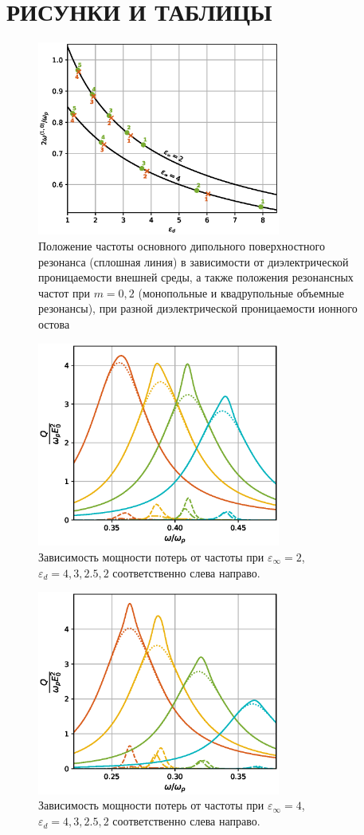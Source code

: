 \documentclass[12pt, a4paper]{article}
\def \eps {\varepsilon}
\begin{document}
\section{РИСУНКИ И ТАБЛИЦЫ}
\begin{figure}[h]
	\centering
	\includegraphics[width=80mm]{./image/fig_w.eps}
	\caption{Положение частоты основного дипольного поверхностного резонанса (сплошная линия) в зависимости от диэлектрической проницаемости внешней среды, а также положения резонансных частот при $m=0,2$ (монопольные и квадрупольные объемные резонансы), при разной диэлектрической проницаемости ионного остова}
	\label{fig_w}
\end{figure} 
\begin{figure}[h]
	\centering
	\includegraphics[width=80mm]{./image/fig1_epsd2.eps}
	\caption{Зависимость мощности потерь от частоты при $\eps_\infty= 2$, $\eps_d = 4, 3, 2.5, 2$ соответственно слева направо.}
	\label{fig1_epsd2}
\end{figure} 
\begin{figure}[h]
	\centering
	\includegraphics[width=80mm]{./image/fig1_epsd4.eps}
	\caption{Зависимость мощности потерь от частоты при $\eps_\infty= 4$, $\eps_d = 4, 3, 2.5, 2$ соответственно слева направо.}
	\label{fig1_epsd4}
\end{figure} 
\end{document}
